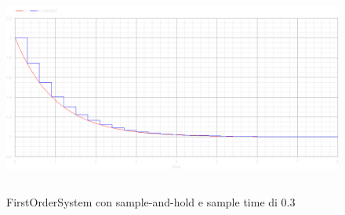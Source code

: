 \begin{figure}[!h]
    \centering
    \includegraphics[width=\textwidth, height=70mm]{Intro/Plot.png}
    \caption{FirstOrderSystem con sample-and-hold e sample time di 0.3}
    \label{fig:my_label}
\end{figure}
